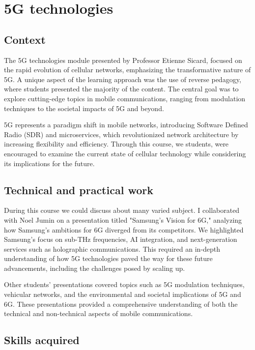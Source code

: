 \section{5G technologies}
\subsection{Context}

\indent \indent The 5G technologies module presented by Professor Etienne Sicard, focused on the rapid evolution of cellular networks, emphasizing the transformative nature of 5G. A unique aspect of the learning approach was the use of reverse pedagogy, where students presented the majority of the content. The central goal was to explore cutting-edge topics in mobile communications, ranging from modulation techniques to the societal impacts of 5G and beyond.

5G represents a paradigm shift in mobile networks, introducing Software Defined Radio (SDR) and microservices, which revolutionized network architecture by increasing flexibility and efficiency. Through this course, we students, were encouraged to examine the current state of cellular technology while considering its implications for the future.
\subsection{Technical and practical work}

\indent \indent During this course we could discuss about many varied subject. I collaborated with Noel Jumin on a presentation titled "Samsung's Vision for 6G," analyzing how Samsung's ambitions for 6G diverged from its competitors. We highlighted Samsung's focus on sub-THz frequencies, AI integration, and next-generation services such as holographic communications. This required an in-depth understanding of how 5G technologies paved the way for these future advancements, including the challenges posed by scaling up.

Other students' presentations covered topics such as 5G modulation techniques, vehicular networks, and the environmental and societal implications of 5G and 6G. These presentations provided a comprehensive understanding of both the technical and non-technical aspects of mobile communications.

\subsection{Skills acquired}
